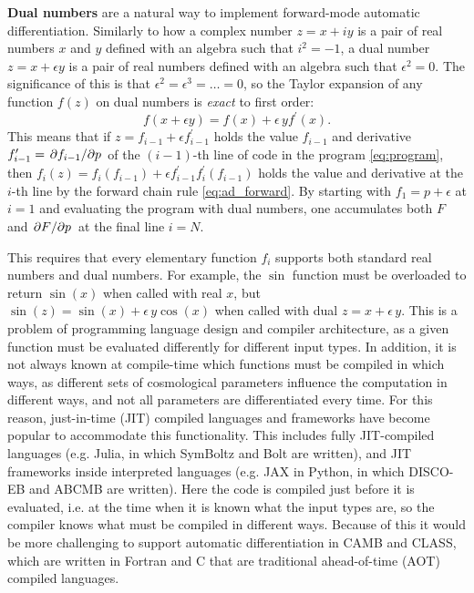 \documentclass[USenglish, thumbmarks]{uiophdthesis} %
\begin{document}
\textbf{Dual numbers} are a natural way to implement forward-mode automatic differentiation.
Similarly to how a complex number $z = x + i y$ is a pair of real numbers $x$ and $y$ defined with an algebra such that $i^2 = -1$,
a dual number $z = x + \epsilon y$ is a pair of real numbers defined with an algebra such that $\epsilon^2 = 0$.
The significance of this is that $\epsilon^2 = \epsilon^3 = \ldots = 0$,
so the Taylor expansion of any function $f(z)$ on dual numbers is \emph{exact} to first order:
\begin{equation}
f(x + \epsilon y) = f(x) + \epsilon \, y f^\prime(x).
\end{equation}
This means that if $z = f_{i-1} + \epsilon f_{i-1}^\prime$ holds the value $f_{i-1}$ and derivative $f_{i-1}^\prime = \pdv{f_{i-1}}/{p}$ of the $(i-1)$-th line of code in the program \eqref{eq:program},
then $f_i(z) = f_i(f_{i-1}) + \epsilon f_{i-1}^\prime f_i^\prime(f_{i-1})$ holds the value and derivative at the $i$-th line by the forward chain rule \eqref{eq:ad_forward}.
By starting with $f_1 = p + \epsilon$ at $i=1$ and evaluating the program with dual numbers,
one accumulates both $F$ and $\pdv{F}/{p}$ at the final line $i=N$.

This requires that every elementary function $f_i$ supports both standard real numbers and dual numbers.
For example, the $\sin$ function must be overloaded to return $\sin(x)$ when called with real $x$,
but $\sin(z) = \sin(x) + \epsilon \, y \cos(x)$ when called with dual $z = x + \epsilon \, y$.
This is a problem of programming language design and compiler architecture,
as a given function must be evaluated differently for different input types.
In addition, it is not always known at compile-time which functions must be compiled in which ways,
as different sets of cosmological parameters influence the computation in different ways,
and not all parameters are differentiated every time.
For this reason, just-in-time (JIT) compiled languages and frameworks have become popular to accommodate this functionality.
This includes fully JIT-compiled languages (e.g. Julia, in which SymBoltz and Bolt are written),
and JIT frameworks inside interpreted languages (e.g. JAX in Python, in which DISCO-EB and ABCMB are written).
Here the code is compiled just before it is evaluated,
i.e. at the time when it is known what the input types are,
so the compiler knows what must be compiled in different ways.
Because of this it would be more challenging to support automatic differentiation in CAMB and CLASS,
which are written in Fortran and C that are traditional ahead-of-time (AOT) compiled languages.
\end{document}
